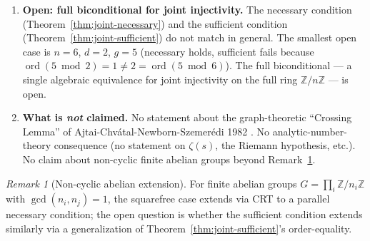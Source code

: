\documentclass[11pt,reqno]{amsart}
\theoremstyle{plain}
\theoremstyle{definition}
\theoremstyle{remark}
\newtheorem{remark}[theorem]{Remark}
\DeclareMathOperator{\ord}{ord}
\newcommand{\Z}{\mathbb{Z}}
\begin{document}
\begin{enumerate}[label={\upshape(\arabic*)}]
\item \textbf{Open: full biconditional for joint injectivity.} The
necessary condition (Theorem~\ref{thm:joint-necessary}) and the
sufficient condition (Theorem~\ref{thm:joint-sufficient}) do not
match in general. The smallest open case is $n = 6$, $d = 2$, $g = 5$
(necessary holds, sufficient fails because $\ord(5 \bmod 2) = 1
\ne 2 = \ord(5 \bmod 6)$). The full biconditional --- a single
algebraic equivalence for joint injectivity on the full ring
$\Z/n\Z$ --- is open.

\item \textbf{What is \emph{not} claimed.} No statement about the
graph-theoretic ``Crossing Lemma'' of
Ajtai-Chv\'atal-Newborn-Szemer\'edi 1982 \cite{ACNS1982}. No
analytic-number-theory consequence (no statement on $\zeta(s)$, the
Riemann hypothesis, etc.). No claim about non-cyclic finite abelian
groups beyond Remark~\ref{rem:abelian-extension}.
\end{enumerate}

\begin{remark}[Non-cyclic abelian extension]\label{rem:abelian-extension}
For finite abelian groups $G = \prod_{i} \Z/n_{i}\Z$ with
$\gcd(n_{i}, n_{j}) = 1$, the squarefree case extends via CRT to a
parallel necessary condition; the open question is whether the
sufficient condition extends similarly via a generalization of
Theorem~\ref{thm:joint-sufficient}'s order-equality.
\end{remark}
\end{document}
